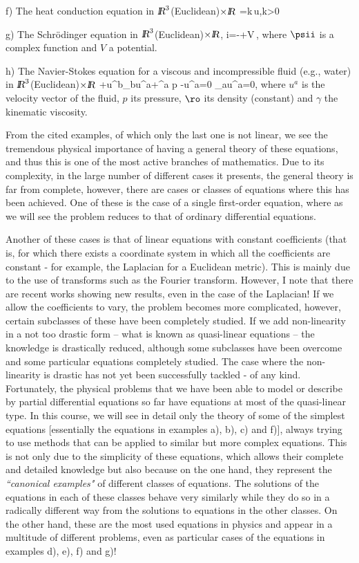 \espa
\noi
f) The heat conduction equation in $\mbox{\sl {l$\!\!\!\;\:\!$R}}^3$(Euclidean)$\times\mbox{\sl {l$\!\!\!\;\:\!$R}}$
\beq
{}=k\,\Del u,\;\;\;\;\;\;\;\;\;k>0
\eeq

\espa
\noi
g) The Schrödinger equation in $\mbox{\sl {l$\!\!\!\;\:\!$R}}^3$(Euclidean)$\times\mbox{\sl {l$\!\!\!\;\:\!$R}}$,
\beq
i\hbar{}=-\Del\psii+V\,\psii,
\eeq
where $\psii$ is a complex function and $V$ a potential.

\espa
\noi
h) The Navier-Stokes equation for a viscous and incompressible fluid (e.g., water) in $\mbox{\sl {l$\!\!\!\;\:\!$R}}^3$(Euclidean)$\times\mbox{\sl {l$\!\!\!\;\:\!$R}}$
\beq
{}+u^b\na_bu^a+\na^a p -\gamma\Del u^a=0
\eeq
\beq
\na_au^a=0,
\eeq
where $u^a$ is the velocity vector of the fluid, $p$ its pressure, $\ro$ its density (constant) and $\gamma$ the kinematic viscosity.

\espa

From the cited examples, of which only the last one is not linear, we see the tremendous physical importance of having a general theory of these equations, and thus this is one of the most active branches of mathematics. Due to its complexity, in the large number of different cases it presents, the general theory is far from complete, however, there are cases or classes of equations where this has been achieved.
One of these is the case of a single first-order equation, where as we will see the problem reduces to that of ordinary differential equations.

Another of these cases is that of linear equations with constant coefficients (that is, for which there exists a coordinate system in which all the coefficients are constant - for example, the Laplacian for a Euclidean metric).
This is mainly due to the use of transforms such as the Fourier transform. However, I note that there are recent works showing new results, even in the case of the Laplacian! If we allow the coefficients to vary, the problem becomes more complicated, however, certain subclasses of these have been completely studied. If we add non-linearity in a not too drastic form -- what is known as quasi-linear equations -- the knowledge is drastically reduced, although some subclasses have been overcome and some particular equations completely studied. The case where the non-linearity is drastic has not yet been successfully tackled - of any kind. Fortunately, the physical problems that we have been able to model or describe by partial differential equations so far have equations at most of the quasi-linear type. In this course, we will see in detail only the theory of some of the simplest equations [essentially the equations in examples a), b), c) and f)], always trying to use methods that can be applied to similar but more complex equations. This is not only due to the simplicity of these equations, which allows their complete and detailed knowledge but also because on the one hand, they represent the \textit{``canonical examples"} of different classes of equations. The solutions of the equations in each of these classes behave very similarly while they do so in a radically different way from the solutions to equations in the other classes. On the other hand, these are the most used equations in physics and appear in a multitude of different problems, even as particular cases of the equations in examples d), e), f) and g)!

